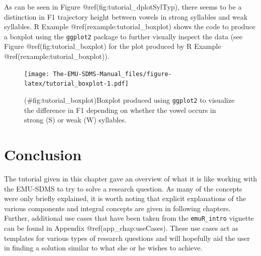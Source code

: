 \documentclass[]{book}
\newenvironment{Shaded}{\begin{snugshade}}{\end{snugshade}}
\newcommand{\KeywordTok}[1]{\textcolor[rgb]{0.13,0.29,0.53}{\textbf{{#1}}}}
\newcommand{\DataTypeTok}[1]{\textcolor[rgb]{0.13,0.29,0.53}{{#1}}}
\newcommand{\DecValTok}[1]{\textcolor[rgb]{0.00,0.00,0.81}{{#1}}}
\newcommand{\StringTok}[1]{\textcolor[rgb]{0.31,0.60,0.02}{{#1}}}
\newcommand{\CommentTok}[1]{\textcolor[rgb]{0.56,0.35,0.01}{\textit{{#1}}}}
\newcommand{\NormalTok}[1]{{#1}}
\theoremstyle{definition}
\theoremstyle{definition}
\theoremstyle{definition}
\theoremstyle{remark}
\begin{document}
As can be seen in Figure @ref(fig:tutorial\_dplotSylTyp), there seems to
be a distinction in F1 trajectory height between vowels in strong
syllables and weak syllables. R Example @ref(rexample:tutorial\_boxplot)
shows the code to produce a boxplot using the \texttt{ggplot2} package
to further visually inspect the data (see Figure
@ref(fig:tutorial\_boxplot) for the plot produced by R Example
@ref(rexample:tutorial\_boxplot)).

\begin{Shaded}
\end{Shaded}

\begin{figure}
\centering
\texttt{[image: The-EMU-SDMS-Manual\_files/figure-latex/tutorial\_boxplot-1.pdf]}
\caption{(\#fig:tutorial\_boxplot)Boxplot produced using
\texttt{ggplot2} to visualize the difference in F1 depending on whether
the vowel occurs in strong (S) or weak (W) syllables.}
\end{figure}

\section{Conclusion}\label{conclusion}

The tutorial given in this chapter gave an overview of what it is like
working with the EMU-SDMS to try to solve a research question. As many
of the concepts were only briefly explained, it is worth noting that
explicit explanations of the various components and integral concepts
are given in following chapters. Further, additional use cases that have
been taken from the \texttt{emuR\_intro} vignette can be found in
Appendix @ref(app\_chap:useCases). These use cases act as templates for
various types of research questions and will hopefully aid the user in
finding a solution similar to what she or he wishes to achieve.
\end{document}
